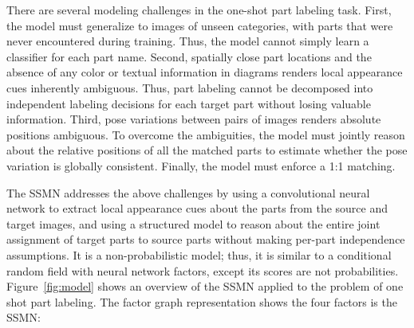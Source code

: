 \documentclass[10pt,twocolumn,letterpaper]{article}
\begin{document}
There are several modeling challenges in the one-shot part labeling task. First, the model must generalize to images of unseen categories, with parts that were never encountered during training. Thus, the model cannot simply learn a classifier for each part name. Second, spatially close part locations and the absence of any color or textual information in diagrams renders local appearance cues inherently ambiguous. Thus, part labeling cannot be decomposed into independent labeling decisions for each target part without losing valuable information. Third, pose variations between pairs of images renders absolute positions ambiguous. To overcome the ambiguities, the model must jointly reason about the relative positions of all the matched parts to estimate whether the pose variation is globally consistent. Finally, the model must enforce a 1:1 matching.

The SSMN addresses the above challenges by using a convolutional neural network to extract local appearance cues about the parts from the source and target images, and using a structured model to reason about the entire joint assignment of target parts to source parts without making per-part independence assumptions. It is a non-probabilistic model; thus, it is similar to a conditional random field \cite{lafferty2001conditional} with neural network factors, except its scores are not probabilities. Figure~\ref{fig:model} shows an overview of the SSMN applied to the problem of one shot part labeling. The factor graph representation shows the four factors is the SSMN:
\end{document}
